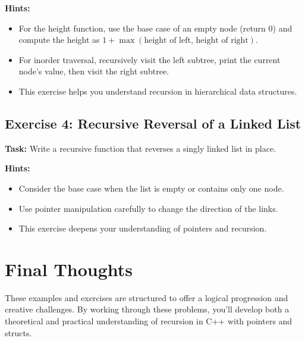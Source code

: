 \documentclass{article}
\begin{document}
\textbf{Hints:}
\begin{itemize}
    \item For the height function, use the base case of an empty node (return 0) and compute the height as \( 1 + \max(\text{height of left, height of right}) \).
    \item For inorder traversal, recursively visit the left subtree, print the current node’s value, then visit the right subtree.
    \item This exercise helps you understand recursion in hierarchical data structures.
\end{itemize}

\subsection{Exercise 4: Recursive Reversal of a Linked List}
\textbf{Task:} Write a recursive function that reverses a singly linked list in place.

\textbf{Hints:}
\begin{itemize}
    \item Consider the base case when the list is empty or contains only one node.
    \item Use pointer manipulation carefully to change the direction of the links.
    \item This exercise deepens your understanding of pointers and recursion.
\end{itemize}

\section{Final Thoughts}
These examples and exercises are structured to offer a logical progression and creative challenges. By working through these problems, you'll develop both a theoretical and practical understanding of recursion in C++ with pointers and structs.
\end{document}
